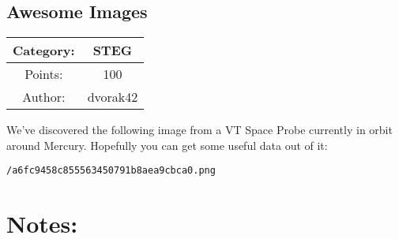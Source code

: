 \begin{center}
\section*{Awesome Images}
{\large
\begin{tabular}{| c c |}
\hline
Category: & STEG\\\hline
Points: & 100\\\hline
Author: & dvorak42\\\hline
\end{tabular}
}
\end{center}
\vspace{0.5in}

{\large
We've discovered the following image from a VT Space Probe currently in orbit around Mercury. Hopefully you can get some useful data out of it:
}
\vspace{0.25in}
\begin{center}
  {\Large\tt /a6fc9458c855563450791b8aea9cbca0.png}
\end{center}

\vspace{0.25in}
\section*{Notes:}

